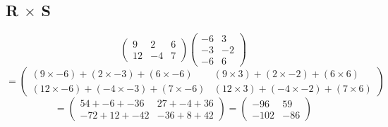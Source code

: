 \documentclass[a4paper,12pt]{article}
\begin{document}
      \newpage

      \subsection{R $\times$ S}
        \begin{equation}
          \begin{pmatrix}
            9 & 2 & 6\\
            12 & -4 & 7
          \end{pmatrix}
          \begin{pmatrix}
            -6 & 3\\
            -3 & -2\\
            -6 & 6
          \end{pmatrix}
        \end{equation}
        \begin{equation}
          =
          \begin{pmatrix}
            ( 9 \times -6) + ( 2 \times -3) + (6 \times -6) & ( 9 \times 3) + ( 2 \times -2) + (6 \times 6)\\
            (12 \times -6) + (-4 \times -3) + (7 \times -6) & (12 \times 3) + (-4 \times -2) + (7 \times 6)
          \end{pmatrix}
        \end{equation}
        \begin{equation}
          =
          \begin{pmatrix}
             54 + -6 + -36 &  27 + -4 + 36\\
            -72 + 12 + -42 & -36 +  8 + 42
          \end{pmatrix}
          =
          \begin{pmatrix}
             -96 & 59\\
            -102 & -86
          \end{pmatrix}
        \end{equation}
\end{document}
